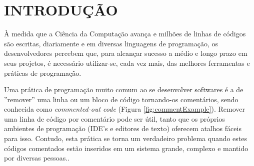 \documentclass{abnt}
\begin{document}








 


\folhaderosto 








\chapter{INTRODUÇÃO}


À medida que a Ciência da Computação avança e milhões de linhas de códigos são 
escritas, diariamente e em diversas linguagens de programação, os desenvolvedores 
percebem que, para alcançar sucesso a médio e longo prazo em seus projetos, é
necessário utilizar-se, cada vez mais, das melhores ferramentas e práticas de 
programação. 

Uma prática de programação muito comum ao se desenvolver softwares é a de 
''remover'' uma linha ou um bloco de código tornando-os comentários, sendo conhecida  
como \textit{commented-out code} (Figura \ref{fig:commentExample}). Remover uma linha de código 
por comentário pode ser útil, tanto que 
os próprios ambientes de programação (IDE's e editores de texto) oferecem atalhos 
fáceis para isso. Contudo, esta prática se torna um verdadeiro problema quando 
estes códigos comentados estão inseridos em um sistema grande, complexo e
mantido por diversas pessoas.\cite{cleanCode}.
\end{document}

